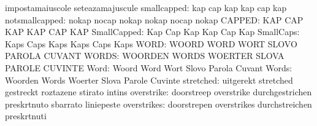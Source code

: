                                  impostamaiuscole                 seteazamajuscule
                     smallcapped: kap                              cap
                                  kap                              kap
                                  cap                              kap
                  notsmallcapped: nokap                            nocap
                                  nokap                            nokap
                                  nocap                            nokap
                          CAPPED: KAP                              CAP
                                  KAP                              KAP
                                  CAP                              KAP
                     SmallCapped: Kap                              Cap
                                  Kap                              Kap
                                  Cap                              Kap
                       SmallCaps: Kaps                             Caps
                                  Kaps                             Kaps
                                  Caps                             Kaps
                            WORD: WOORD                            WORD
                                  WORT                             SLOVO
                                  PAROLA                           CUVANT
                           WORDS: WOORDEN                          WORDS
                                  WOERTER                          SLOVA
                                  PAROLE                           CUVINTE
                            Word: Woord                            Word
                                  Wort                             Slovo
                                  Parola                           Cuvant
                           Words: Woorden                          Words
                                  Woerter                          Slova
                                  Parole                           Cuvinte
                       stretched: uitgerekt                        stretched
                                  gestreckt                        roztazene
                                  stirato                          intins
                      overstrike: doorstreep                       overstrike
                                  durchgestrichen                  preskrtnuto
                                  sbarrato                         liniepeste
                     overstrikes: doorstrepen                      overstrikes
                                  durchstreichen                   preskrtnuti
